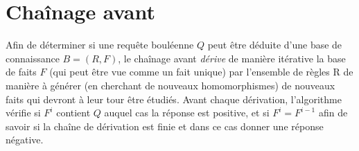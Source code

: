 
\section{Chaînage avant}\label{def_forward}

Afin de déterminer si une requête bouléenne $Q$ peut être déduite d'une base de connaissance 
$B = (R,F)$, 
le chaînage avant {\em dérive} de manière itérative la base de faits $F$ (qui peut être 
vue comme un fait unique) par l'ensemble de  règles R de manière à générer (en cherchant
de nouveaux homomorphismes) de nouveaux faits qui devront à leur tour être étudiés.
Avant chaque dérivation, l'algorithme vérifie si $F^i$ contient $Q$ auquel cas la réponse 
est positive, et si $F^{i} = F^{i-1}$ afin de savoir si la chaîne de dérivation est finie et 
dans ce cas donner une réponse négative.



